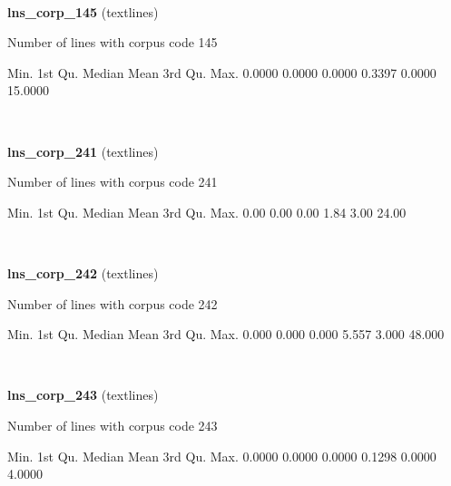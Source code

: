 \documentclass[]{article}
\newenvironment{Shaded}{\begin{snugshade}}{\end{snugshade}}
\newcommand{\FloatTok}[1]{\textcolor[rgb]{0.00,0.00,0.81}{{#1}}}
\newcommand{\NormalTok}[1]{{#1}}
\begin{document}
~

\vspace{1em}

\textbf{lns\_corp\_145} (textlines)

Number of lines with corpus code 145

\begin{Shaded}
\begin{Highlighting}[]
   \NormalTok{Min. 1st Qu.  Median    Mean 3rd Qu.    Max. }
 \FloatTok{0.0000}  \FloatTok{0.0000}  \FloatTok{0.0000}  \FloatTok{0.3397}  \FloatTok{0.0000} \FloatTok{15.0000} 
\end{Highlighting}
\end{Shaded}

~

\vspace{1em}

\textbf{lns\_corp\_241} (textlines)

Number of lines with corpus code 241

\begin{Shaded}
\begin{Highlighting}[]
   \NormalTok{Min. 1st Qu.  Median    Mean 3rd Qu.    Max. }
   \FloatTok{0.00}    \FloatTok{0.00}    \FloatTok{0.00}    \FloatTok{1.84}    \FloatTok{3.00}   \FloatTok{24.00} 
\end{Highlighting}
\end{Shaded}

~

\vspace{1em}

\textbf{lns\_corp\_242} (textlines)

Number of lines with corpus code 242

\begin{Shaded}
\begin{Highlighting}[]
   \NormalTok{Min. 1st Qu.  Median    Mean 3rd Qu.    Max. }
  \FloatTok{0.000}   \FloatTok{0.000}   \FloatTok{0.000}   \FloatTok{5.557}   \FloatTok{3.000}  \FloatTok{48.000} 
\end{Highlighting}
\end{Shaded}

~

\vspace{1em}

\textbf{lns\_corp\_243} (textlines)

Number of lines with corpus code 243

\begin{Shaded}
\begin{Highlighting}[]
   \NormalTok{Min. 1st Qu.  Median    Mean 3rd Qu.    Max. }
 \FloatTok{0.0000}  \FloatTok{0.0000}  \FloatTok{0.0000}  \FloatTok{0.1298}  \FloatTok{0.0000}  \FloatTok{4.0000} 
\end{Highlighting}
\end{Shaded}
\end{document}

